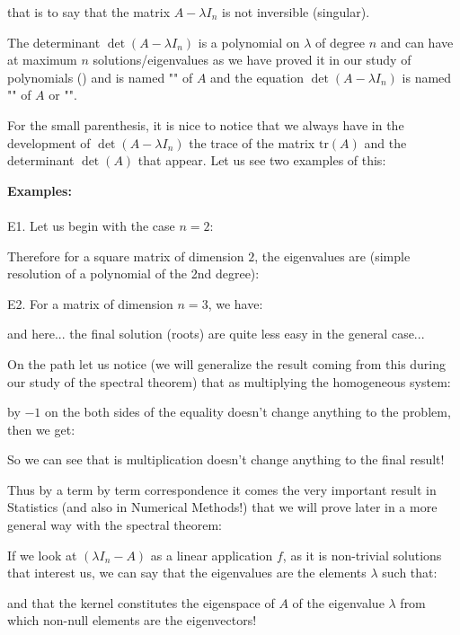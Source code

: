 	that is to say that the matrix $A-\lambda I_n$ is not inversible (singular).
	
	The determinant $\det(A-\lambda I_n)$ is a polynomial on $\lambda$ of degree $n$ and can have at maximum $n$ solutions/eigenvalues as we have proved it in our study of polynomials () and is named "" of $A$ and the equation $\det(A-\lambda I_n)$ is named ""  of $A$ or "".
	
	For the small parenthesis, it is nice to notice that we always have in the development of $\det(A-\lambda I_n)$ the trace of the matrix $\text{tr}(A)$ and the determinant $\det (A)$ that appear. Let us see two examples of this:
	
	\pagebreak
	\begin{tcolorbox}[colframe=black,colback=white,sharp corners]
	\textbf{{\Large {}}Examples:}\\\\
	E1. Let us begin with the case $n=2$:
	
	Therefore for a square matrix of dimension $2$, the eigenvalues are (simple resolution of a polynomial of the 2nd degree):
	
	E2. For a matrix of dimension $n=3$, we have:
	
	and here... the final solution (roots) are quite less easy in the general case...
	\end{tcolorbox}
	On the path let us notice (we will generalize the result coming from this during our study of the spectral theorem) that as multiplying the homogeneous system:
	
	by $-1$ on the both sides of the equality doesn't change anything to the problem, then we get:
	
	So we can see that is multiplication doesn't change anything to the final result!
	
	Thus by a term by term correspondence it comes the very important result in Statistics (and also in Numerical Methods!) that we will prove later in a more general way with the spectral theorem:
	
	If we look at $(\lambda I_n-A)$ as a linear application $f$, as it is non-trivial solutions that interest us, we can say that the eigenvalues are the elements $\lambda$ such that:
	
	and that the kernel constitutes the eigenspace  of $A$ of the eigenvalue $\lambda$ from which non-null elements are the eigenvectors!
	
